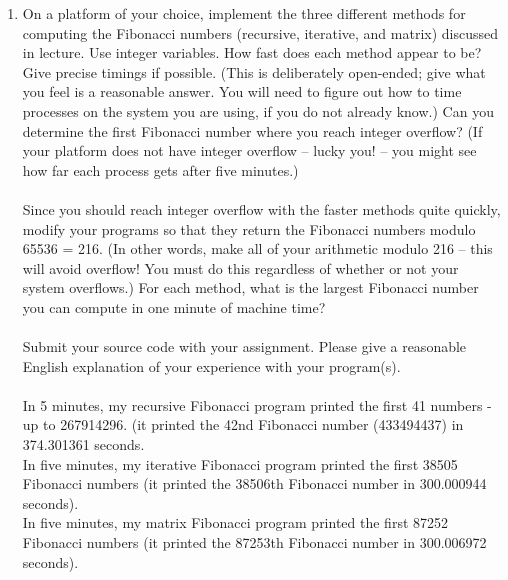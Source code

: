 \documentclass[11pt]{article}
\begin{document}
\begin{enumerate}

\item On a platform of your choice, implement the three different methods for computing the Fibonacci
numbers (recursive, iterative, and matrix) discussed in lecture. Use integer variables. How fast does
each method appear to be? Give precise timings if possible. (This is deliberately open-ended; give
what you feel is a reasonable answer. You will need to figure out how to time processes on the system
you are using, if you do not already know.) Can you determine the first Fibonacci number where you
reach integer overflow? (If your platform does not have integer overflow – lucky you! – you might
see how far each process gets after five minutes.)\\
\\
Since you should reach integer overflow with the faster methods quite quickly, modify your programs
so that they return the Fibonacci numbers modulo 65536 = 216. (In other words, make all of your
arithmetic modulo 216 – this will avoid overflow! You must do this regardless of whether or not your
system overflows.) For each method, what is the largest Fibonacci number you can compute in one
minute of machine time?\\
\\
Submit your source code with your assignment. Please give a reasonable English explanation of your
experience with your program(s).
\\\\
In 5 minutes, my recursive Fibonacci program printed the first 41 numbers - up to 267914296. (it printed the 42nd Fibonacci number (433494437) in 374.301361 seconds.\\
In five minutes, my iterative Fibonacci program printed the first 38505 Fibonacci numbers (it printed the 38506th Fibonacci number in 300.000944 seconds).\\
In five minutes, my matrix Fibonacci program printed the first 87252 Fibonacci numbers (it printed the 87253th Fibonacci number in 300.006972 seconds).\\


\end{enumerate}
\end{document}
